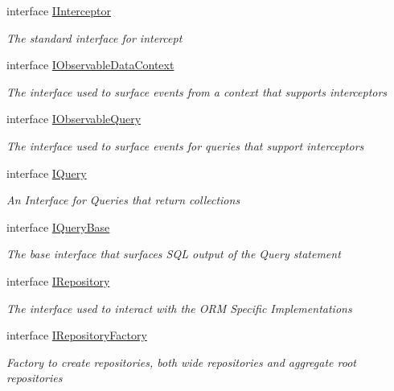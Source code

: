 \begin{DoxyCompactItemize}
interface \hyperlink{interface_highway_1_1_data_1_1_interfaces_1_1_i_interceptor-g}{I\-Interceptor}
\begin{DoxyCompactList}\small\item\em The standard interface for intercept \end{DoxyCompactList}\item 
interface \hyperlink{interface_highway_1_1_data_1_1_interfaces_1_1_i_observable_data_context}{I\-Observable\-Data\-Context}
\begin{DoxyCompactList}\small\item\em The interface used to surface events from a context that supports interceptors \end{DoxyCompactList}\item 
interface \hyperlink{interface_highway_1_1_data_1_1_interfaces_1_1_i_observable_query}{I\-Observable\-Query}
\begin{DoxyCompactList}\small\item\em The interface used to surface events for queries that support interceptors \end{DoxyCompactList}\item 
interface \hyperlink{interface_highway_1_1_data_1_1_interfaces_1_1_i_query-g}{I\-Query}
\begin{DoxyCompactList}\small\item\em An Interface for Queries that return collections \end{DoxyCompactList}\item 
interface \hyperlink{interface_highway_1_1_data_1_1_interfaces_1_1_i_query_base}{I\-Query\-Base}
\begin{DoxyCompactList}\small\item\em The base interface that surfaces S\-Q\-L output of the Query statement \end{DoxyCompactList}\item 
interface \hyperlink{interface_highway_1_1_data_1_1_interfaces_1_1_i_repository}{I\-Repository}
\begin{DoxyCompactList}\small\item\em The interface used to interact with the O\-R\-M Specific Implementations \end{DoxyCompactList}\item 
interface \hyperlink{interface_highway_1_1_data_1_1_interfaces_1_1_i_repository_factory}{I\-Repository\-Factory}
\begin{DoxyCompactList}\small\item\em Factory to create repositories, both wide repositories and aggregate root repositories \end{DoxyCompactList}\item 

\end{DoxyCompactItemize}
